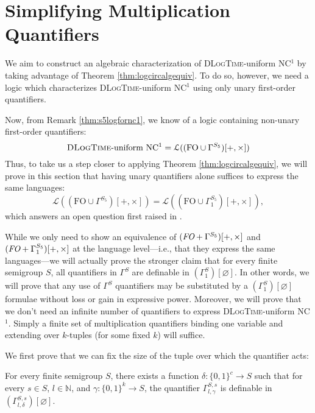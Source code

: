 \documentclass[a4paper,UKenglish,cleveref, autoref, thm-restate, anonymous]{lipics-v2021}
\begin{document}
\section{Simplifying Multiplication Quantifiers}\label{sec:mult}


We aim to construct an algebraic characterization of \textsc{DLogTime}-uniform NC${}^1$ by taking advantage of Theorem \ref{thm:logcircalgequiv}. To do so, however, we need a logic which characterizes \textsc{DLogTime}-uniform NC${}^1$ using only unary first-order quantifiers.

Now, from Remark \ref{thm:s5logfornc1}, we know of a logic containing non-unary first-order quantifiers:
\begin{equation*}\label{eq:foo1}
    \text{\textsc{DLogTime}-uniform NC${}^1$} = \mathcal{L}((\text{FO} \cup \Gamma^{S_5})[+,\times])
\end{equation*} Thus, to take us a step closer to applying Theorem \ref{thm:logcircalgequiv}, we will prove in this section that having unary quantifiers alone suffices to express the same languages: \[
    \mathcal{L}((\text{FO} \cup \Gamma^{S_5})[+,\times]) = \mathcal{L}((\text{FO} \cup \Gamma^{S_5}_1)[+,\times]),
\] which answers an open question first raised in \cite{lautemann2001descriptive}.

While we only need to show an equivalence of $(\emph{FO} + \Gamma^{S_5})[+,\times]$ and $(\emph{FO} + \Gamma^{S_5}_1)[+,\times]$ at the language level---i.e., that they express the same languages---we will actually prove the stronger claim that for every finite semigroup $S$, all quantifiers in $\Gamma^{S}$ are definable in $(\Gamma^S_1)[\varnothing]$. In other words, we will prove that any use of $\Gamma^{S}$ quantifiers may be substituted by a $(\Gamma^S_1)[\varnothing]$ formulae without loss or gain in expressive power. Moreover, we will prove that we don't need an infinite number of quantifiers to express \textsc{DLogTime}-uniform NC${}^1$. Simply a finite set of multiplication quantifiers binding one variable and extending over $k$-tuples (for some fixed $k$) will suffice.

We first prove that we can fix the size of the tuple over which the quantifier acts:

\begin{lemma}\label{lem:finitetuple}
    For every finite semigroup $S$, there exists a function $\delta : \{0,1\}^c \rightarrow S$ such that for every $s \in S$, $l \in \mathbb{N}$, and $\gamma : \{0,1\}^k \rightarrow S$, the quantifier $\Gamma^{S,s}_{l,\gamma}$ is definable in $(\Gamma^{S,s}_{l,\delta})[\varnothing]$.
\end{lemma}
\end{document}
